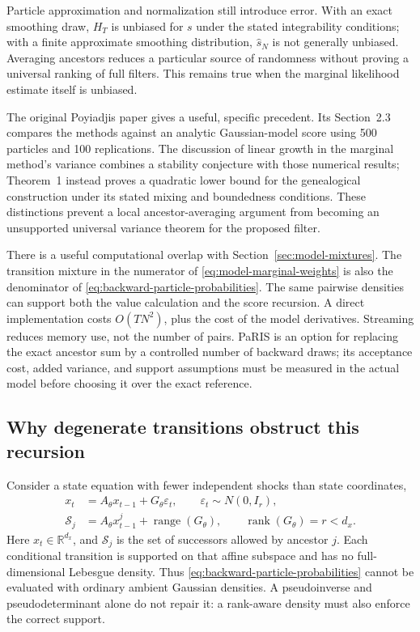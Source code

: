 \documentclass[11pt]{article}
\newcommand{\R}{\mathbb{R}}
\begin{document}
Particle approximation and normalization still introduce error. With an
exact smoothing draw, $H_T$ is unbiased for $s$ under the stated integrability
conditions; with a finite approximate smoothing distribution,
$\widehat s_N$ is not generally unbiased. Averaging ancestors reduces a
particular source of randomness without proving a universal ranking of full
filters. This remains true when the marginal likelihood estimate itself is
unbiased.

The original Poyiadjis paper gives a useful, specific precedent. Its
Section~2.3 compares the methods against an analytic Gaussian-model score
using 500 particles and 100 replications. The discussion of linear growth in
the marginal method's variance combines a stability conjecture with those
numerical results; Theorem~1 instead proves a quadratic lower bound for the
genealogical construction under its stated mixing and boundedness conditions.
These distinctions prevent a local ancestor-averaging argument from becoming
an unsupported universal variance theorem for the proposed filter.

There is a useful computational overlap with
Section~\ref{sec:model-mixtures}. The transition mixture in the numerator
of \eqref{eq:model-marginal-weights} is also the denominator of
\eqref{eq:backward-particle-probabilities}. The same pairwise densities can
support both the value calculation and the score recursion. A direct
implementation costs $O(TN^2)$, plus the cost of the model derivatives.
Streaming reduces memory use, not the number of pairs. PaRIS is an option
for replacing the exact ancestor sum by a controlled number of backward
draws; its acceptance cost, added variance, and support assumptions must be
measured in the actual model before choosing it over the exact reference.

\subsection{Why degenerate transitions obstruct this recursion}
\label{sec:fisher-degenerate}

Consider a state equation with fewer independent shocks than state
coordinates,
\begin{align}
 x_t&=A_\theta x_{t-1}+G_\theta\varepsilon_t,
 \qquad \varepsilon_t\sim N(0,I_r),\\
 \mathcal S_j&=A_\theta x_{t-1}^j+\operatorname{range}(G_\theta),
 \qquad \operatorname{rank}(G_\theta)=r<d_x.
 \label{eq:degenerate-ancestor-supports}
\end{align}
Here $x_t\in\R^{d_x}$, and $\mathcal S_j$ is the set of successors allowed
by ancestor $j$. Each conditional transition is supported on that affine
subspace and has no full-dimensional Lebesgue density. Thus
\eqref{eq:backward-particle-probabilities} cannot be evaluated with ordinary
ambient Gaussian densities. A pseudoinverse and pseudodeterminant alone do
not repair it: a rank-aware density must also enforce the correct support.
\end{document}
